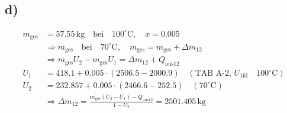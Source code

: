 

\subsection*{d)}
\begin{align*}
m_{\text{ges}} &= 57.55 \, \text{kg} \quad \text{bei} \quad 100^\circ \text{C}, \quad x = 0.005 \\
&\Rightarrow m_{\text{ges}} \quad \text{bei} \quad 70^\circ \text{C}, \quad m_{\text{ges}} = m_{\text{ges}} + \Delta m_{12} \\
&\Rightarrow m_{\text{ges}} U_2 - m_{\text{ges}} U_1 = \Delta m_{12} + Q_{\text{aus}12} \\
U_1 &= 418.1 + 0.005 \cdot (2506.5 - 2000.9) \quad \left( \text{TAB A-2, } U_{1\text{fd}} \quad 100^\circ \text{C} \right) \\
U_2 &= 232.857 + 0.005 \cdot (2466.6 - 252.5) \quad \left( 70^\circ \text{C} \right) \\
&\Rightarrow \Delta m_{12} = \frac{m_{\text{ges}} (U_2 - U_1) - Q_{\text{aus}12}}{1 - U_2} = 2501.405 \, \text{kg}
\end{align*}